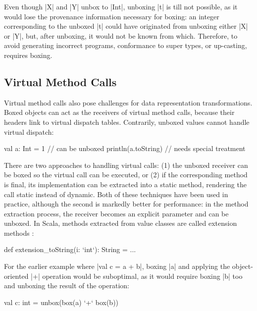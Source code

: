Even though |X| and |Y| unbox to |Int|, unboxing |t| is till not possible, as it would lose the provenance information necessary for boxing: an integer corresponding to the unboxed |t| could have originated from unboxing either |X| or |Y|, but, after unboxing, it would not be known from which. Therefore, to avoid generating incorrect programs, conformance to super types, or up-casting, requires boxing.

\subsection{Virtual Method Calls}
\label{ldl:sec:problem-oo/virtual-method-calls}

Virtual method calls also pose challenges for data representation transformations. Boxed objects can act as the receivers of virtual  method calls, because their headers link to virtual dispatch tables. Contrarily, unboxed values cannot handle virtual dispatch:

\begin{lstlisting-nobreak}
 val a: Int = 1             // can be unboxed
 println(a.toString) // needs special treatment
\end{lstlisting-nobreak}

There are two approaches to handling virtual calls: (1) the unboxed receiver can be boxed so the virtual call can be executed, or (2) if the corresponding method is final, its implementation can be extracted into a static method, rendering the call static instead of dynamic. Both of these techniques have been used in practice, although the second is markedly better for performance: in the method extraction process, the receiver becomes an explicit parameter and can be unboxed. In Scala, methods extracted from value classes are called extension methods \cite{sip-value-classes}:

\begin{lstlisting-nobreak}
 def extension_toString(i: `int`): String = ...
\end{lstlisting-nobreak}

For the earlier example where |val c = a + b|, boxing |a| and applying the object-oriented |+| operation would be suboptimal, as it would require boxing |b| too and unboxing the result of the operation:

\begin{lstlisting-nobreak}
 val c: int = unbox(box(a) `+` box(b))
\end{lstlisting-nobreak}

